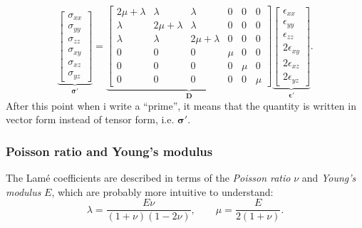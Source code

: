 \documentclass[acmtog]{acmart}
\begin{document}
\begin{equation}
  \underbrace{ \begin{bmatrix}
      \sigma_{xx} \\
      \sigma_{yy} \\
      \sigma_{zz} \\
      \sigma_{xy} \\
      \sigma_{xz} \\
      \sigma_{yz}
    \end{bmatrix} }_{ \boldsymbol \sigma' } = \underbrace{ \begin{bmatrix}
      2 \mu + \lambda & \lambda         & \lambda         & 0   & 0   & 0   \\
      \lambda         & 2 \mu + \lambda & \lambda         & 0   & 0   & 0   \\
      \lambda         & \lambda         & 2 \mu + \lambda & 0   & 0   & 0   \\
      0               & 0               & 0               & \mu & 0   & 0   \\
      0               & 0               & 0               & 0   & \mu & 0   \\
      0               & 0               & 0               & 0   & 0   & \mu
    \end{bmatrix} }_{ \boldsymbol D } \underbrace{ \begin{bmatrix}
      \epsilon_{xx}   \\
      \epsilon_{yy}   \\
      \epsilon_{zz}   \\
      2 \epsilon_{xy} \\
      2 \epsilon_{xz} \\
      2 \epsilon_{yz}
    \end{bmatrix} }_{ \boldsymbol \epsilon' }.
\end{equation}
%
After this point when i write a ``prime'', it means that the quantity is written in vector form instead of tensor form, i.e. $\boldsymbol \sigma'$.

\subsubsection*{Poisson ratio and Young's modulus}
The Lamé coefficients are described in terms of the \textit{Poisson ratio} $\nu$ and \textit{Young's modulus} $E$, which are probably more intuitive to understand:
%
\begin{equation}
  \lambda = \frac{E \nu}{(1 + \nu)(1 - 2 \nu)}, \qquad \mu = \frac{E}{2(1+ \nu)}.
\end{equation}
%
\end{document}
